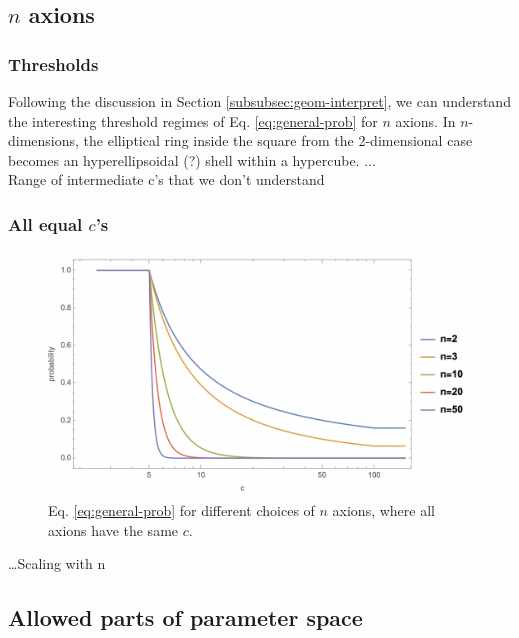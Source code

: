 \documentclass{article}
\begin{document}
\subsection{$n$ axions}
\subsubsection{Thresholds}
Following the discussion in Section \ref{subsubsec:geom-interpret}, we can understand the interesting threshold regimes of Eq. \eqref{eq:general-prob} for $n$ axions. In $n$-dimensions, the elliptical ring inside the square from the 2-dimensional case becomes an hyperellipsoidal (?) shell within a hypercube. ... \\
Range of intermediate c's that we don't understand

\subsubsection{All equal $c$'s}

\begin{figure}[h]
    \includegraphics[scale=0.45]{figs/naxions-equalC.png}
    \centering
    \caption{Eq. \eqref{eq:general-prob} for different choices of $n$ axions, where all axions have the same $c$.}
    \label{fig:n-prob-equalC}
\end{figure}
\dots Scaling with n

\subsection{Allowed parts of parameter space}
\end{document}
